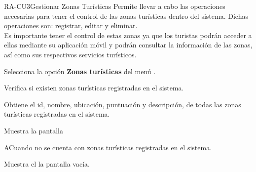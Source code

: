
% 



	\begin{UseCase}{RA-CU3}{Gestionar Zonas Turísticas}{
		Permite llevar a cabo las operaciones necesarias para tener el control de las zonas turísticas dentro del sistema. Dichas operaciones son: registrar, editar y eliminar.\\
		
		Es importante tener el control de estas zonas ya que los turistas podrán acceder a ellas mediante su aplicación móvil y podrán consultar la información de las zonas, así como sus respectivos servicios turísticos. 
	}
	\end{UseCase}
	\begin{UCtrayectoria} 
		
		\UCpaso [\UCactor] Selecciona la opción \textbf{Zonas turísticas} del menú .
		
		\UCpaso Verifica si existen zonas turísticas registradas en el sistema. 
		
		\UCpaso Obtiene el id, nombre, ubicación, puntuación y descripción, de todas las zonas turísticas registradas en el sistema.
		
		\UCpaso Muestra la pantalla  
		
	\end{UCtrayectoria}


	\begin{UCtrayectoriaA}{A}{Cuando no se cuenta con zonas turísticas registradas en el sistema.}
		
		\UCpaso Muestra el la pantalla  vacía.
		
	\end{UCtrayectoriaA}
	